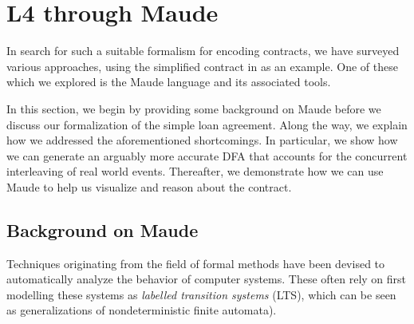 \documentclass{article}
\begin{document}



\section{L4 through Maude}

In search for such a suitable formalism for encoding contracts,
we have surveyed various approaches, using the simplified contract in
\cite[Fig 1.]{contract_as_automaton} as an example.
One of these which we explored is the Maude language and its associated tools.

In this section, we begin by providing some background on Maude before
we discuss our formalization of the simple loan agreement.
Along the way, we explain how we addressed the aforementioned shortcomings.
In particular, we show how we can generate an arguably more accurate DFA that
accounts for the concurrent interleaving of real world events.
Thereafter, we demonstrate how we can use Maude to help us
visualize and reason about the contract.

\subsection{Background on Maude}
Techniques originating from the field of formal methods have been devised to
automatically analyze the behavior of computer systems.
These often rely on first modelling these systems as
\textit{labelled transition systems} (LTS), which can be seen as
generalizations of nondeterministic finite automata).
\end{document}
